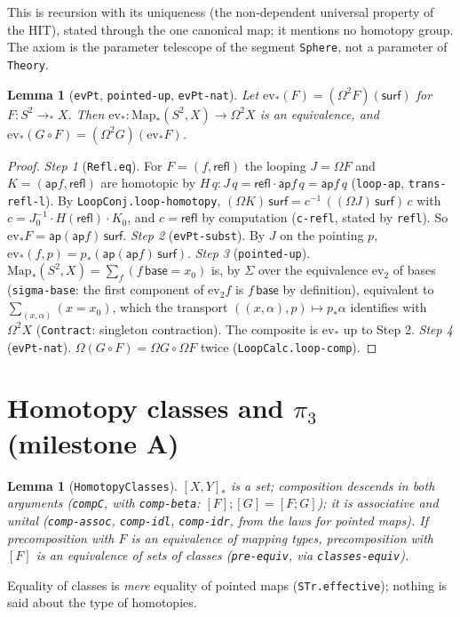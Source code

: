 \documentclass[11pt]{amsart}
\newtheorem{lemma}[theorem]{Lemma}
\theoremstyle{definition}
\theoremstyle{remark}
\newcommand{\Om}{\Omega}
\newcommand{\Map}{\mathrm{Map}_*}
\newcommand{\cls}[1]{[#1]}
\newcommand{\hc}[2]{[#1,#2]_*}
\newcommand{\code}[1]{\texttt{#1}}
\begin{document}
This is recursion with its uniqueness (the non-dependent universal
property of the HIT), stated through the one canonical map; it mentions
no homotopy group. The axiom is the parameter telescope of the segment
\code{Sphere}, not a parameter of \code{Theory}.

\begin{lemma}[\code{evPt}, \code{pointed-up}, \code{evPt-nat}]\label{lem:sphere}
Let $\mathrm{ev}_*(F)=(\Om^2F)(\mathsf{surf})$ for $F:S^2\to_*X$. Then
$\mathrm{ev}_*:\Map(S^2,X)\to\Om^2X$ is an equivalence, and
$\mathrm{ev}_*(G\circ F)=(\Om^2G)(\mathrm{ev}_*F)$.
\end{lemma}
\begin{proof}
\emph{Step 1} (\code{Refl.eq}). For $F=(f,\mathsf{refl})$ the looping $J=\Om F$
and $K=(\mathsf{ap}f,\mathsf{refl})$ are homotopic by
$H\,q:J\,q=\mathsf{refl}\cdot\mathsf{ap}f\,q=\mathsf{ap}f\,q$
(\code{loop-ap}, \code{trans-refl-l}). By \code{LoopConj.loop-homotopy},
$(\Om K)\,\mathsf{surf}=c^{-1}\,((\Om J)\,\mathsf{surf})\,c$ with
$c=J_0^{-1}\cdot H(\mathsf{refl})\cdot K_0$, and $c=\mathsf{refl}$ by
computation (\code{c-refl}, stated by \code{refl}). So
$\mathrm{ev}_*F=\mathsf{ap}(\mathsf{ap}f)\,\mathsf{surf}$.
\emph{Step 2} (\code{evPt-subst}). By $J$ on the pointing $p$,
$\mathrm{ev}_*(f,p)=p_*(\mathsf{ap}(\mathsf{ap}f)\,\mathsf{surf})$.
\emph{Step 3} (\code{pointed-up}). $\Map(S^2,X)=\sum_f(f\,\mathsf{base}=x_0)$
is, by $\Sigma$ over the equivalence $\mathrm{ev}_2$ of bases
(\code{sigma-base}: the first component of $\mathrm{ev}_2f$ is
$f\,\mathsf{base}$ by definition), equivalent to
$\sum_{(x,\alpha)}(x=x_0)$, which the transport $((x,\alpha),p)\mapsto
p_*\alpha$ identifies with $\Om^2X$ (\code{Contract}: singleton
contraction). The composite is $\mathrm{ev}_*$ up to Step 2.
\emph{Step 4} (\code{evPt-nat}). $\Om(G\circ F)=\Om G\circ\Om F$ twice
(\code{LoopCalc.loop-comp}).
\end{proof}

\section{Homotopy classes and $\pi_3$ (milestone A)}

\begin{lemma}[\code{HomotopyClasses}]
$\hc XY$ is a set; composition descends in both arguments
(\code{compC}, with \code{comp-beta}: $\cls F;\cls G=\cls{F;G}$); it is
associative and unital (\code{comp-assoc}, \code{comp-idl},
\code{comp-idr}, from the laws for pointed maps). If precomposition with
$F$ is an equivalence of mapping types, precomposition with $\cls F$ is
an equivalence of sets of classes (\code{pre-equiv}, via
\code{classes-equiv}).
\end{lemma}
Equality of classes is \emph{mere} equality of pointed maps
(\code{STr.effective}); nothing is said about the type of homotopies.
\end{document}
